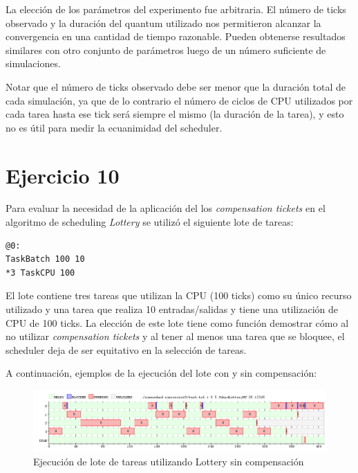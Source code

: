 \documentclass[a4paper,10pt,twoside]{article}
\begin{document}
La elección de los parámetros del experimento fue arbitraria. El número de ticks observado y la duración del quantum utilizado nos permitieron alcanzar la convergencia en una cantidad de tiempo razonable. Pueden obtenerse resultados similares con otro conjunto de parámetros luego de un número suficiente de simulaciones.

Notar que el número de ticks observado debe ser menor que la duración total de cada simulación, ya que de lo contrario el número de ciclos de CPU utilizados por cada tarea hasta ese tick será siempre el mismo (la duración de la tarea), y esto no es útil para medir la ecuanimidad del scheduler.



\section{Ejercicio 10}

Para evaluar la necesidad de la aplicación del los \textit{compensation tickets} en el algoritmo de scheduling \textit{Lottery} se utilizó el siguiente lote de tareas:
\begin{verbatim}
@0:
TaskBatch 100 10
*3 TaskCPU 100
\end{verbatim}
El lote contiene tres tareas que utilizan la CPU (100 ticks) como su único recurso utilizado y una tarea que realiza 10 entradas/salidas y tiene una utilización de CPU de 100 ticks. La elección de este lote tiene como función demostrar cómo al no utilizar \textit{compensation tickets} y al tener al menos una tarea que se bloquee, el scheduler deja de ser equitativo en la selección de tareas.

A continuación, ejemplos de la ejecución del lote con y sin compensación:

\begin{figure}[H]
\centering
\includegraphics[width=175mm]{../ejercicio10/GraphSchedLotNC.png}
\caption{Ejecución de lote de tareas utilizando Lottery sin compensación}
\label{GraphSchedLotNC}
\end{figure}
\end{document}
